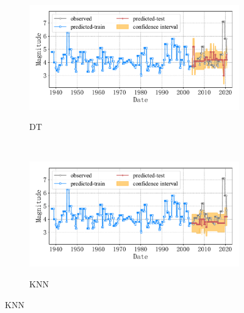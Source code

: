 \begin{figure}[!htbp]
\begin{subfigure}[b]{0.45\textwidth}
    \vspace{-1cm}
    \label{fig:seism_gbr_minyear_1932_maxyear_2021_spanlat_2_spanlon_4_timewindow_72_nextmonth_12_minmag_3.0_block_1}
  \end{subfigure}
  ~
  \begin{subfigure}[b]{0.45\textwidth}
    \caption{DT}
    \vspace{-0.2cm}
    \includegraphics[width=\textwidth]{Img/chap5_seism/block1/seism_dt_minyear_1932_maxyear_2021_spanlat_2_spanlon_4_timewindow_72_nextmonth_12_minmag_3.0_block_1.pdf}
    \vspace{-1cm}
    \label{fig:seism_dt_minyear_1932_maxyear_2021_spanlat_2_spanlon_4_timewindow_72_nextmonth_12_minmag_3.0_block_1}
  \end{subfigure}
  \\
  \begin{subfigure}[b]{0.45\textwidth}
    \caption{KNN}
    \vspace{-0.2cm}
    \includegraphics[width=\textwidth]{Img/chap5_seism/block1/seism_kn_minyear_1932_maxyear_2021_spanlat_2_spanlon_4_timewindow_72_nextmonth_12_minmag_3.0_block_1.pdf}
    \vspace{-1cm}
    \label{fig:seism_knn_minyear_1932_maxyear_2021_spanlat_2_spanlon_4_timewindow_72_nextmonth_12_minmag_3.0_block_1}

\end{subfigure}
\end{figure}
